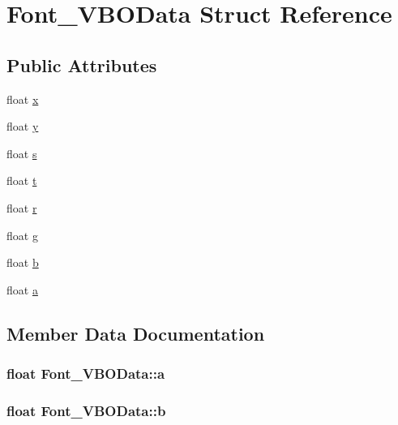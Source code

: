 \hypertarget{struct_font___v_b_o_data}{
\section{Font\_\-VBOData Struct Reference}
\label{struct_font___v_b_o_data}
}
\subsection*{Public Attributes}
\begin{CompactItemize}
\item 
float \hyperlink{struct_font___v_b_o_data_5e12cc9ec0606ecb631238d1ae9d9f0f}{x}
\item 
float \hyperlink{struct_font___v_b_o_data_8994d6d37aea91d225b0466aaed458c8}{y}
\item 
float \hyperlink{struct_font___v_b_o_data_94f6dd23c0690c82a2104c26a8b85059}{s}
\item 
float \hyperlink{struct_font___v_b_o_data_452e1831a208659f6c0c9854b2598d43}{t}
\item 
float \hyperlink{struct_font___v_b_o_data_385916d3f544760de7c0f86743164a07}{r}
\item 
float \hyperlink{struct_font___v_b_o_data_48323912ccdf88ec6f878e1dedca93a8}{g}
\item 
float \hyperlink{struct_font___v_b_o_data_f919ff94372d868b6cace23b5efc06fc}{b}
\item 
float \hyperlink{struct_font___v_b_o_data_fc82ffbf740dfc75d775ca085a48e710}{a}
\end{CompactItemize}


\subsection{Member Data Documentation}
\hypertarget{struct_font___v_b_o_data_fc82ffbf740dfc75d775ca085a48e710}{
\subsubsection[{a}]{\setlength{\rightskip}{0pt plus 5cm}float {\bf Font\_\-VBOData::a}}}
\label{struct_font___v_b_o_data_fc82ffbf740dfc75d775ca085a48e710}


\hypertarget{struct_font___v_b_o_data_f919ff94372d868b6cace23b5efc06fc}{
\subsubsection[{b}]{\setlength{\rightskip}{0pt plus 5cm}float {\bf Font\_\-VBOData::b}}}
\label{struct_font___v_b_o_data_f919ff94372d868b6cace23b5efc06fc}



